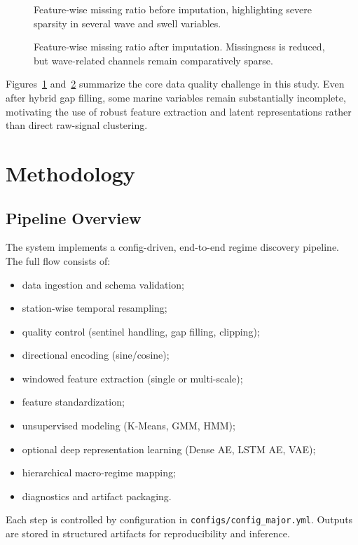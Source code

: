 \documentclass[conference]{IEEEtran}
\begin{document}
\begin{figure}[t]
\centering

\caption{Feature-wise missing ratio before imputation, highlighting severe sparsity in several wave and swell variables.}
\label{fig:missing_before}
\end{figure}

\begin{figure}[t]
\centering

\caption{Feature-wise missing ratio after imputation. Missingness is reduced, but wave-related channels remain comparatively sparse.}
\label{fig:missing_after}
\end{figure}

Figures~\ref{fig:missing_before} and~\ref{fig:missing_after} summarize the core data quality challenge in this study. Even after hybrid gap filling, some marine variables remain substantially incomplete, motivating the use of robust feature extraction and latent representations rather than direct raw-signal clustering.

\section{Methodology}

\subsection{Pipeline Overview}
The system implements a config-driven, end-to-end regime discovery pipeline. The full flow consists of:
\begin{itemize}
\item data ingestion and schema validation;
\item station-wise temporal resampling;
\item quality control (sentinel handling, gap filling, clipping);
\item directional encoding (sine/cosine);
\item windowed feature extraction (single or multi-scale);
\item feature standardization;
\item unsupervised modeling (K-Means, GMM, HMM);
\item optional deep representation learning (Dense AE, LSTM AE, VAE);
\item hierarchical macro-regime mapping;
\item diagnostics and artifact packaging.
\end{itemize}
Each step is controlled by configuration in \texttt{configs/config\_major.yml}. Outputs are stored in structured artifacts for reproducibility and inference.
\end{document}

